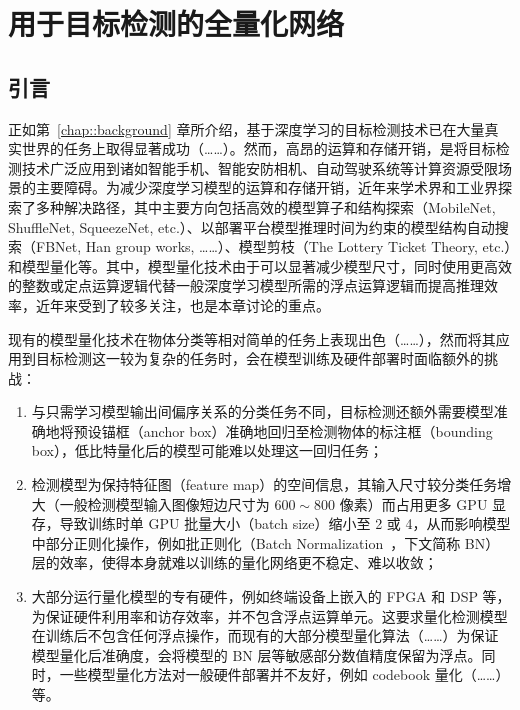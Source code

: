 \chapter{用于目标检测的全量化网络} \label{chap::fqn}
\section{引言}
正如第~\ref{chap::background} 章所介绍，基于深度学习的目标检测技术已在大量真实世界的任务上取得显著成功（……）。然而，高昂的运算和存储开销，是将目标检测技术广泛应用到诸如智能手机、智能安防相机、自动驾驶系统等计算资源受限场景的主要障碍。为减少深度学习模型的运算和存储开销，近年来学术界和工业界探索了多种解决路径，其中主要方向包括高效的模型算子和结构探索（MobileNet, ShuffleNet, SqueezeNet, etc.）、以部署平台模型推理时间为约束的模型结构自动搜索（FBNet, Han group works, ……）、模型剪枝（The Lottery Ticket Theory, etc.）和模型量化等。其中，模型量化技术由于可以显著减少模型尺寸，同时使用更高效的整数或定点运算逻辑代替一般深度学习模型所需的浮点运算逻辑而提高推理效率，近年来受到了较多关注，也是本章讨论的重点。

现有的模型量化技术在物体分类等相对简单的任务上表现出色（……），然而将其应用到目标检测这一较为复杂的任务时，会在模型训练及硬件部署时面临额外的挑战：
\begin{enumerate}[1)]
  \item 与只需学习模型输出间偏序关系的分类任务不同，目标检测还额外需要模型准确地将预设锚框（anchor box）准确地回归至检测物体的标注框（bounding box），低比特量化后的模型可能难以处理这一回归任务；
  \item 检测模型为保持特征图（feature map）的空间信息，其输入尺寸较分类任务增大（一般检测模型输入图像短边尺寸为 $600\sim 800$ 像素）而占用更多 GPU 显存，导致训练时单 GPU 批量大小（batch size）缩小至 2 或 4，从而影响模型中部分正则化操作，例如批正则化（Batch Normalization~\citep{ioffe2015batch}，下文简称 BN）层的效率，使得本身就难以训练的量化网络更不稳定、难以收敛；
  \item 大部分运行量化模型的专有硬件，例如终端设备上嵌入的 FPGA 和 DSP 等，为保证硬件利用率和访存效率，并不包含浮点运算单元。这要求量化检测模型在训练后不包含任何浮点操作，而现有的大部分模型量化算法（……）为保证模型量化后准确度，会将模型的 BN 层等敏感部分数值精度保留为浮点。同时，一些模型量化方法对一般硬件部署并不友好，例如 codebook 量化（……）等。
\end{enumerate}

